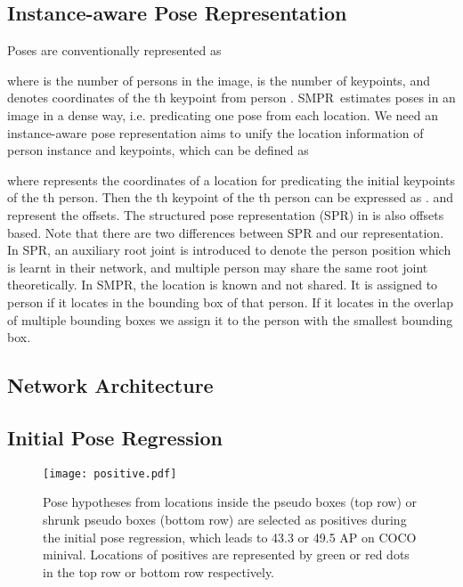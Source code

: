 \documentclass[11pt,twocolumn,journal]{IEEEtran}
\newcommand{\SMPR}{SMPR}
\begin{document}
\subsection{Instance-aware Pose Representation}
Poses are conventionally represented as 

where  is the number of persons in the image,  is the number of keypoints, and  denotes coordinates of the th keypoint from person . 
\SMPR~estimates poses in an image in a dense way, i.e. predicating one pose from each location. We need an 
instance-aware pose representation aims to unify the location information of person instance and keypoints, which can be defined as 

where  represents the coordinates of a location for predicating the initial keypoints of the th person. Then the th keypoint of the th person can be expressed as .  and  represent the offsets. The structured pose representation (SPR) in \cite{spm19} is also offsets based. 
Note that there are two differences between SPR and our representation. In SPR, an auxiliary root joint  is introduced to denote the person position which is learnt in their network, and multiple person may share the same root joint theoretically. In \SMPR, the location  is known and not shared. It is assigned to person  if it locates in the bounding box of that person. If it locates in the overlap of multiple bounding boxes we assign it to the person with the smallest bounding box.  

\subsection{Network Architecture}

\subsection{Initial Pose Regression}
\begin{figure}[t]
\texttt{[image: positive.pdf]}
    \caption{Pose hypotheses from locations inside the pseudo boxes (top row) or shrunk pseudo boxes (bottom row) are selected as positives during the initial pose regression, which leads to 43.3 or 49.5 AP on COCO minival. Locations of positives are represented by green or red dots in the top row or bottom row respectively.}
    \label{fig_position_filter}
\end{figure}
\end{document}
